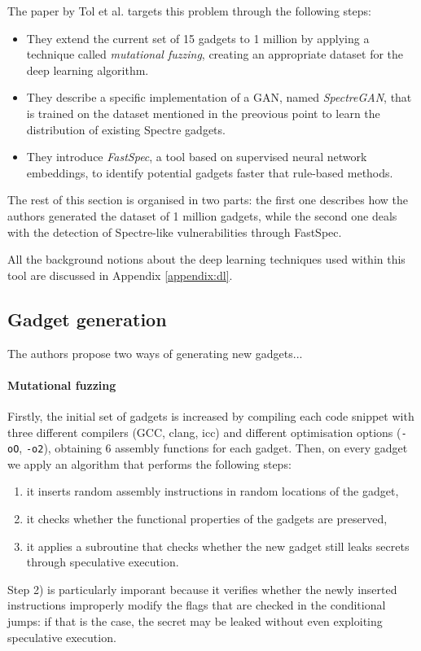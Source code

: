 \documentclass[12pt,a4paper]{book}
\theoremstyle{definition}
\begin{document}
	The paper by Tol et al. targets this problem through the following steps:
	\begin{itemize}
		\item They extend the current set of 15 gadgets to 1 million by applying a technique called \textit{mutational fuzzing}, creating an appropriate dataset for the deep learning algorithm.
		\item They describe a specific implementation of a GAN, named \textit{SpectreGAN}, that is trained on the dataset mentioned in the preovious point to learn the distribution of existing Spectre gadgets.
		\item They introduce \textit{FastSpec}, a tool based on supervised neural network embeddings, to identify potential gadgets faster that rule-based methods.
	\end{itemize}
	The rest of this section is organised in two parts: the first one describes how the authors generated the dataset of 1 million gadgets, while the second one deals with the detection of Spectre-like vulnerabilities through FastSpec. 
	
	All the background notions about the deep learning techniques used within this tool are discussed in Appendix \ref{appendix:dl}.
	\subsection{Gadget generation}
	The authors propose two ways of generating new gadgets...
	\paragraph{Mutational fuzzing}
	Firstly, the initial set of gadgets is increased by compiling each code snippet with three different compilers (GCC, clang, icc) and different optimisation options (\texttt{-oO}, \texttt{-o2}), obtaining 6 assembly functions for each gadget. Then, on every gadget we apply an algorithm that performs the following steps:
	\begin{enumerate}
		\item it inserts random assembly instructions in random locations of the gadget,
		\item it checks whether the functional properties of the gadgets are preserved,
		\item it applies a subroutine that checks whether the new gadget still leaks secrets through speculative execution.
	\end{enumerate}
	Step 2) is particularly imporant because it verifies whether the newly inserted instructions improperly modify the flags that are checked in the conditional jumps: if that is the case, the secret may be leaked without even exploiting speculative execution.
	
\end{document}
